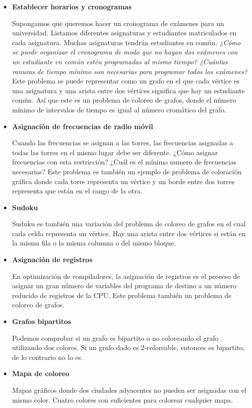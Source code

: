 \documentclass[11pt,a4paper]{article}
\theoremstyle{plain}
\begin{document}
\begin{itemize}

\item{\textbf{{{{Establecer horarios y cronogramas}}}}}

Supongamos que queremos hacer un cronograma de exámenes para un universidad. Listamos diferentes asignaturas y estudiantes matriculados en cada asignatura. Muchas asignaturas tendrán estudiantes en común. \emph{¿Cómo se puede organizar el cronograma de modo que no hayan dos exámenes con un estudiante en común estén programadas al mismo tiempo? ¿Cuántas ranuras de tiempo mínimo son necesarias para programar todos los exámenes?} Este problema se puede representar como un grafo en el que cada vértice es una asignatura y una arista entre dos vértices significa que hay un estudiante común. Así que este es un problema de coloreo de grafos, donde el número mínimo de intervalos de tiempo es igual al número cromático del grafo.

\item{\textbf{{{Asignación de frecuencias de radio móvil}}}}

Cuando las frecuencias se asignan a las torres, las frecuencias asignadas a todas las torres en el mismo lugar debe ser diferente. ¿Cómo asignar frecuencias con esta restricción? ¿Cuál es el mínimo numero de frecuencias necesarias? Este problema es también un ejemplo de problema de coloración gráfica donde cada torre representa un vértice y un borde entre dos torres representa que están en el rango de la otra.

\item{\textbf{{{Sudoku}}}}

Suduku es también una variación del problema de coloreo de grafos en el cual cada celda representa un vértice. Hay una arista entre dos vértices si están en la misma fila o la misma columna o del mismo bloque.

\item{\textbf{{{Asignación de registros}}}}

En optimización de compiladores, la asignación de registros es el proceso de asignar un gran número de variables del programa de destino a un número reducido de registros de la CPU. Este problema también un problema de coloreo de grafos.

\item{\textbf{{{Grafos bipartitos}}}}

Podemos comprobar si un grafo es bipartito o no coloreando el grafo utilizando dos colores. Si un grafo dado es 2-coloreable, entonces es bipartito, de lo contrario no lo es. 
 
\item{\textbf{{{Mapa de coloreo}}}}

Mapas gráficos donde dos ciudades adyacentes no pueden ser asignadas con el mismo color. Cuatro colores son suficientes para colorear cualquier mapa\cite {2}.

\end{itemize}
 
\end{document}
